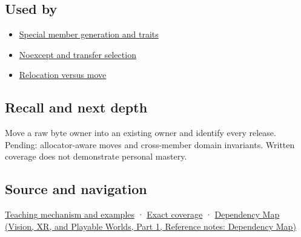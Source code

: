 \subsection{Used by}\label{appendix-5636651017c2-used-by}

\hypertarget{appendix-5636651017c2-used-by}{}

\begin{itemize}
\tightlist
\item
  \hyperref[appendix-42e02a12c694]{Special member generation and traits}
\item
  \hyperref[appendix-c746afaa47d1]{Noexcept and transfer selection}
\item
  \hyperref[appendix-adfd6397af8d]{Relocation versus move}
\end{itemize}

\subsection{Recall and next depth}\label{appendix-5636651017c2-recall-and-next-depth}

\hypertarget{appendix-5636651017c2-recall-and-next-depth}{}

Move a raw byte owner into an existing owner and identify every release. Pending: allocator-aware moves and cross-member domain invariants. Written coverage does not demonstrate personal mastery.

\subsection{Source and navigation}\label{appendix-5636651017c2-source-and-navigation}

\hypertarget{appendix-5636651017c2-source-and-navigation}{}

\hyperref[01-foundations-i-ch003-a-move-transfers-responsibility-while-the-source-survives]{Teaching mechanism and examples} · \hyperref[appendix-fd090d982a15-m009---parts-127-147]{Exact coverage} · \href{../07-Vision-XR-and-Playable-Worlds-P01/main.pdf\#appendix-4ad47bdd269a}{Dependency Map (Vision, XR, and Playable Worlds, Part 1, Reference notes: Dependency Map)}
